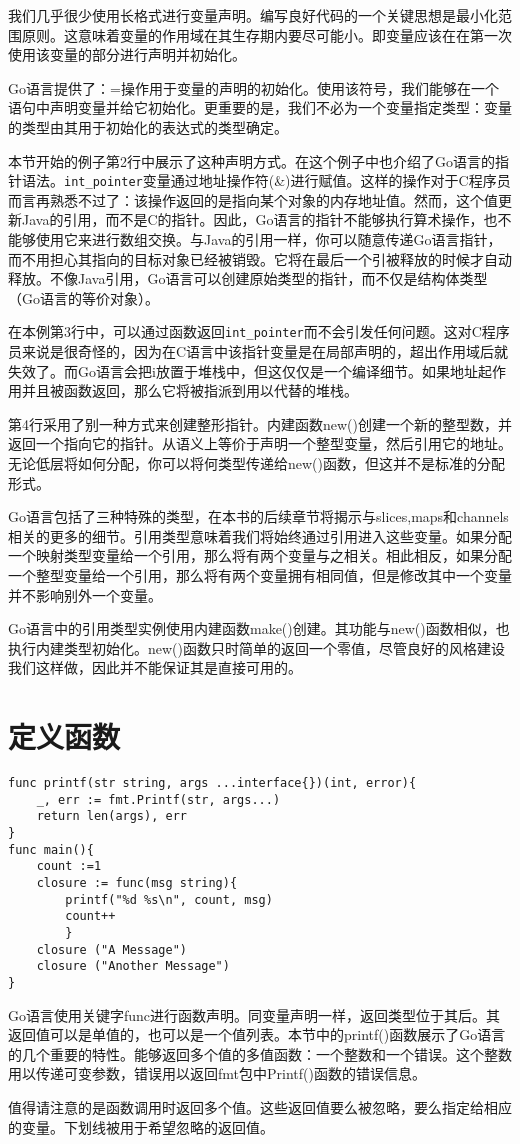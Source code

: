 我们几乎很少使用长格式进行变量声明。编写良好代码的一个关键思想是最小化范围原则。这意味着变量的作用域在其生存期内要尽可能小。即变量应该在在第一次使用该变量的部分进行声明并初始化。

Go语言提供了：=操作用于变量的声明的初始化。使用该符号，我们能够在一个语句中声明变量并给它初始化。更重要的是，我们不必为一个变量指定类型：变量的类型由其用于初始化的表达式的类型确定。

本节开始的例子第2行中展示了这种声明方式。在这个例子中也介绍了Go语言的指针语法。\lstinline$int_pointer$变量通过地址操作符(\&)进行赋值。这样的操作对于C程序员而言再熟悉不过了：该操作返回的是指向某个对象的内存地址值。然而，这个值更新Java的引用，而不是C的指针。因此，Go语言的指针不能够执行算术操作，也不能够使用它来进行数组交换。与Java的引用一样，你可以随意传递Go语言指针，而不用担心其指向的目标对象已经被销毁。它将在最后一个引被释放的时候才自动释放。不像Java引用，Go语言可以创建原始类型的指针，而不仅是结构体类型（Go语言的等价对象）。

在本例第3行中，可以通过函数返回\lstinline$int_pointer$而不会引发任何问题。这对C程序员来说是很奇怪的，因为在C语言中该指针变量是在局部声明的，超出作用域后就失效了。而Go语言会把i放置于堆栈中，但这仅仅是一个编译细节。如果地址起作用并且被函数返回，那么它将被指派到用以代替的堆栈。

第4行采用了别一种方式来创建整形指针。内建函数new()创建一个新的整型数，并返回一个指向它的指针。从语义上等价于声明一个整型变量，然后引用它的地址。无论低层将如何分配，你可以将何类型传递给new()函数，但这并不是标准的分配形式。

Go语言包括了三种特殊的类型，在本书的后续章节将揭示与slices,maps和channels相关的更多的细节。引用类型意味着我们将始终通过引用进入这些变量。如果分配一个映射类型变量给一个引用，那么将有两个变量与之相关。相此相反，如果分配一个整型变量给一个引用，那么将有两个变量拥有相同值，但是修改其中一个变量并不影响别外一个变量。

Go语言中的引用类型实例使用内建函数make()创建。其功能与new()函数相似，也执行内建类型初始化。new()函数只时简单的返回一个零值，尽管良好的风格建设我们这样做，因此并不能保证其是直接可用的。

\section{定义函数}
\begin{lstlisting}
func printf(str string, args ...interface{})(int, error){
	_, err := fmt.Printf(str, args...)
	return len(args), err
}
func main(){
	count :=1
	closure := func(msg string){
		printf("%d %s\n", count, msg)
		count++
		}
	closure ("A Message")
	closure ("Another Message")
}
\end{lstlisting}

Go语言使用关键字func进行函数声明。同变量声明一样，返回类型位于其后。其返回值可以是单值的，也可以是一个值列表。本节中的printf()函数展示了Go语言的几个重要的特性。能够返回多个值的多值函数：一个整数和一个错误。这个整数用以传递可变参数，错误用以返回fmt包中Printf()函数的错误信息。

值得请注意的是函数调用时返回多个值。这些返回值要么被忽略，要么指定给相应的变量。下划线被用于希望忽略的返回值。



\endinput